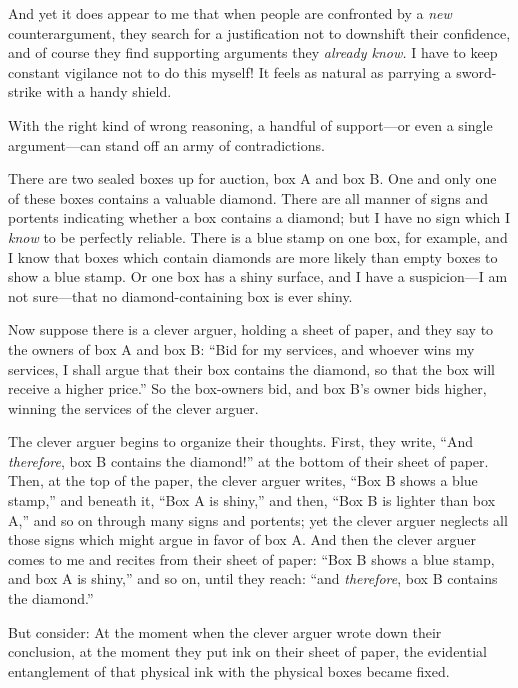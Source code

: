 {
 And yet it does appear to me that when people are confronted by a
\textit{new} counterargument, they search for a justification not to
downshift their confidence, and of course they find supporting
arguments they \textit{already know.} I have to keep constant vigilance
not to do this myself! It feels as natural as parrying a sword-strike
with a handy shield.}

{
 With the right kind of wrong reasoning, a handful of support---or
even a single argument---can stand off an army of contradictions.}

\myendsectiontext


{
 There are two sealed boxes up for auction, box A and box B. One
and only one of these boxes contains a valuable diamond. There are all
manner of signs and portents indicating whether a box contains a
diamond; but I have no sign which I \textit{know} to be perfectly
reliable. There is a blue stamp on one box, for example, and I know
that boxes which contain diamonds are more likely than empty boxes to
show a blue stamp. Or one box has a shiny surface, and I have a
suspicion---I am not sure---that no diamond-containing box is ever
shiny. }

{
 Now suppose there is a clever arguer, holding a sheet of paper,
and they say to the owners of box A and box B: ``Bid
for my services, and whoever wins my services, I shall argue that their
box contains the diamond, so that the box will receive a higher
price.'' So the box-owners bid, and box
B's owner bids higher, winning the services of the
clever arguer.}

{
 The clever arguer begins to organize their thoughts. First, they
write, ``And \textit{therefore}, box B contains the
diamond!'' at the bottom of their sheet of paper.
Then, at the top of the paper, the clever arguer writes,
``Box B shows a blue stamp,'' and
beneath it, ``Box A is shiny,'' and
then, ``Box B is lighter than box
A,'' and so on through many signs and portents; yet
the clever arguer neglects all those signs which might argue in favor
of box A. And then the clever arguer comes to me and recites from their
sheet of paper: ``Box B shows a blue stamp, and box A
is shiny,'' and so on, until they reach:
``and \textit{therefore}, box B contains the
diamond.''}

{
 But consider: At the moment when the clever arguer wrote down
their conclusion, at the moment they put ink on their sheet of paper,
the evidential entanglement of that physical ink with the physical
boxes became fixed.}

